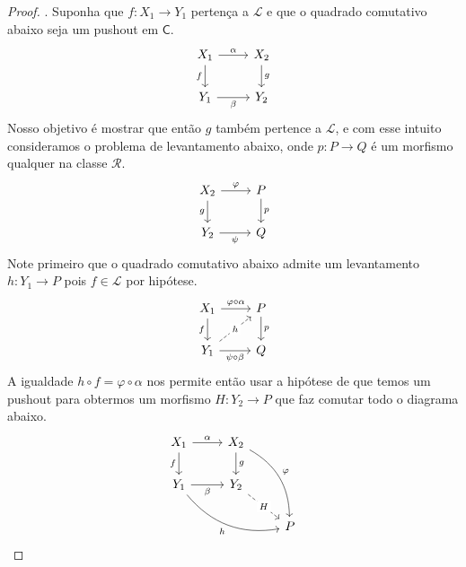 \begin{proof}
  . Suponha que $f: X_{1} \to Y_{1}$ pertença a $\mathcal{L}$ e que o quadrado comutativo abaixo seja um pushout em $\mathsf{C}$.
  \begin{displaymath}
    \begin{tikzcd}
      X_{1}
      \arrow[r, "\alpha"]
      \arrow[d, "f" swap]
      & X_{2}
      \arrow[d, "g"]
      \\ Y_{1}
      \arrow[r, "\beta" swap]
      & Y_{2}
    \end{tikzcd}
  \end{displaymath}
  Nosso objetivo é mostrar que então $g$ também pertence a $\mathcal{L}$, e com esse intuito consideramos o problema de levantamento abaixo, onde $p: P \to Q$ é um morfismo qualquer na classe $\mathcal{R}$.
  \begin{displaymath}
    \begin{tikzcd}
      X_{2}
      \arrow[r, "\varphi"]
      \arrow[d, "g" swap]
      & P
      \arrow[d, "p"]
      \\ Y_{2}
      \arrow[r, "\psi" swap]
      & Q
    \end{tikzcd}
  \end{displaymath}
  Note primeiro que o quadrado comutativo abaixo admite um levantamento $h: Y_{1} \to P$ pois $f \in \mathcal{L}$ por hipótese.
  \begin{displaymath}
    \begin{tikzcd}
      X_{1}
      \arrow[r, "\varphi \circ \alpha"]
      \arrow[d, "f" swap]
      & P
      \arrow[d, "p"]
      \\ Y_{1}
      \arrow[r, "\psi \circ \beta" swap]
      \arrow[ru, dashed, "h" description]
      & Q
    \end{tikzcd}
  \end{displaymath}
  A igualdade $h \circ f = \varphi \circ \alpha$ nos permite então usar a hipótese de que temos um pushout para obtermos um morfismo $H: Y_{2} \to P$ que faz comutar todo o diagrama abaixo.
  \begin{displaymath}
     \begin{tikzcd}
      X_{1}
      \arrow[r, "\alpha"]
      \arrow[d, "f" swap]
      & X_{2}
      \arrow[d, "g"]
      \arrow[rdd, bend left=30, "\varphi"]
      \\ Y_{1}
      \arrow[r, "\beta" swap]
      \arrow[rrd, bend right=30, "h" swap]
      & Y_{2}
      \arrow[rd, dashed, "H" description]
      \\ & & P
    \end{tikzcd}
  \end{displaymath}

\end{proof}
